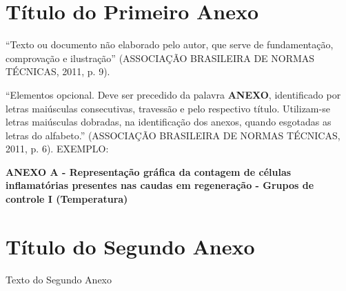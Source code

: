 \documentclass[
        12pt,
        openany, %
        oneside, %
        a4paper,
        english,
        brazil			        %
        ]{abntbibufjf}
\begin{document}
\begin{anexosenv}

\chapter{T\'itulo do Primeiro Anexo}
``Texto ou documento n\~ao elaborado pelo autor, que serve de fundamenta\c{c}\~ao,
comprova\c{c}\~ao e ilustra\c{c}\~ao''
(ASSOCIA\c{C}\~AO BRASILEIRA DE NORMAS T\'ECNICAS, 2011, p. 9).

``Elementos opcional. Deve ser precedido da palavra \textbf{ANEXO}, identificado por letras mai\'usculas
consecutivas, travess\~ao e pelo respectivo t\'itulo. Utilizam-se letras mai\'usculas dobradas,
na identifica\c{c}\~ao dos anexos, quando esgotadas as letras do alfabeto.''
(ASSOCIA\c{C}\~AO BRASILEIRA DE NORMAS T\'ECNICAS, 2011, p. 6).
\newline
EXEMPLO:
\begin{center}
\textbf{ANEXO A - Representa\c{c}\~ao gr\'afica da contagem de c\'elulas inflamat\'orias presentes
nas caudas em regenera\c{c}\~ao - Grupos de controle I (Temperatura)}
\end{center}


\chapter{T\'itulo do Segundo Anexo}
Texto do Segundo Anexo


\end{anexosenv}

\end{document}
